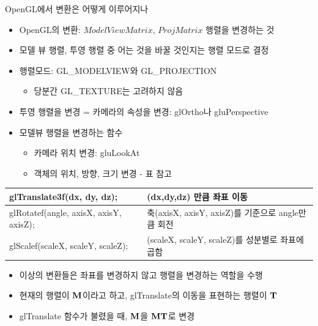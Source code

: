 \documentclass{beamer}
\begin{document}
\begin{frame}[fragile]{OpenGL에서 변환은 어떻게 이루어지나}

{\small
\begin{itemize}
\item OpenGL의 변환: $ModelViewMatrix$, $ProjMatrix$ 행렬을 변경하는 것
\item 모델 뷰 행렬, 투영 행렬 중 어는 것을 바꿀 것인지는 행렬 모드로 결정
\item 행렬모드: {\sf GL\_MODELVIEW}와 {\sf GL\_PROJECTION}  
	\begin{itemize}
	\item 당분간 {\sf GL\_TEXTURE}는 고려하지 않음
	\end{itemize}
\item 투영 행렬을 변경 = 카메라의 속성을 변경: {\sf glOrtho}나 {\sf gluPerspective}
\item 모델뷰 행렬을 변경하는 함수
	\begin{itemize}
	\item 카메라 위치 변경: {\sf gluLookAt}
	\item 객체의 위치, 방향, 크기 변경 - 표 참고
	\end{itemize}
\end{itemize}

    \begin{tabular}{ |l| p{7cm} |}
    \hline
    {\tiny \sf glTranslate3f(dx, dy, dz);} & {\tiny \sf (dx,dy,dz) 만큼 좌표 이동} \\ \hline
    {\tiny \sf glRotatef(angle, axisX, axisY, axisZ);} & {\tiny \sf 축(axisX, axisY, axisZ)를 기준으로 angle만큼 회전}\\ \hline
    {\tiny \sf glScalef(scaleX, scaleY, scaleZ);} & {\tiny \sf  (scaleX, scaleY, scaleZ)를 성분별로 좌표에 곱함}\\ \hline
    \hline
    \end{tabular}

\begin{itemize}
\item 이상의 변환들은 좌표를 변경하지 않고 행렬을 변경하는 역할을 수행
\item 현재의 행렬이 $\bf M$이라고 하고, {\sf glTranslate}의 이동을 표현하는 행렬이 $\bf T$
\item {\sf glTranslate} 함수가 불렸을 때, $\bf M$을 $\bf MT$로 변경
\end{itemize}
}

\end{frame}
\end{document}
